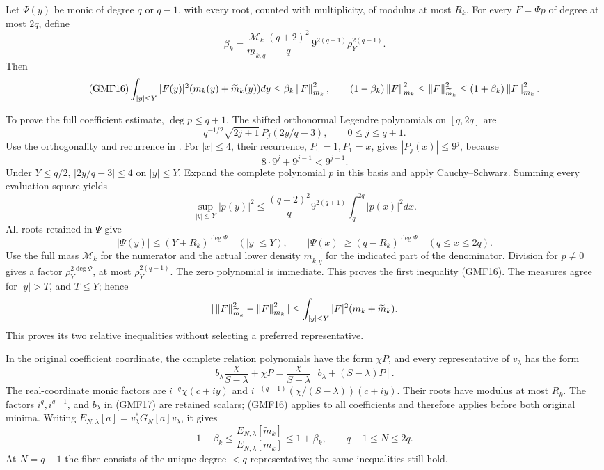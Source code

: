 \documentclass[11pt,a4paper]{article}
\begin{document}
Let \(\Psi(y)\) be monic of degree \(q\) or \(q-1\), with
every root, counted with multiplicity, of modulus at most \(R_k\).
For every \(F=\Psi p\) of degree at most \(2q\), define
\begin{equation}\tag{GMF15}
 \beta_k=
 \frac{\mathcal M_k}{\underline m_{k,q}}
 \frac{(q+2)^2}{q}\,9^{2(q+1)}
                     \rho_Y^{2(q-1)}.
\end{equation}
Then
\begin{equation}\tag{GMF16}
 \int_{|y|\le Y}|F(y)|^2(m_k(y)+\widetilde m_k(y))dy
 \le\beta_k\left\lVert F\right\rVert_{m_k}^2,\qquad
 (1-\beta_k)\left\lVert F\right\rVert_{m_k}^2
 \le\left\lVert F\right\rVert_{\widetilde m_k}^2
 \le(1+\beta_k)\left\lVert F\right\rVert_{m_k}^2.
\end{equation}

To prove the full coefficient estimate, \(\deg p\le q+1\).
The shifted orthonormal Legendre polynomials on \([q,2q]\)
are
\[
 q^{-1/2}\sqrt{2j+1}\,P_j(2y/q-3),\qquad 0\le j\le q+1.
\]
Use the orthogonality and recurrence in
\cite[Tables 18.3.1 and 18.9.1]{a02gmf:dlmfLegendre}.
For \(|x|\le4\), their recurrence, \(P_0=1,P_1=x\), gives
\(|P_j(x)|\le9^j\), because
\[
 8\cdot9^j+9^{j-1}<9^{j+1}.
\]
Under \(Y\le q/2\), \(|2y/q-3|\le4\) on \(|y|\le Y\).
Expand the complete polynomial \(p\) in this basis and
apply Cauchy--Schwarz.  Summing every evaluation square yields
\[
 \sup_{|y|\le Y}|p(y)|^2
 \le\frac{(q+2)^2}{q}9^{2(q+1)}
                         \int_q^{2q}|p(x)|^2dx.
\]
All roots retained in \(\Psi\) give
\[
 |\Psi(y)|\le(Y+R_k)^{\deg\Psi}\quad(|y|\le Y),\qquad
 |\Psi(x)|\ge(q-R_k)^{\deg\Psi}\quad(q\le x\le2q).
\]
Use the full mass \(\mathcal M_k\) for the numerator and the
actual lower density \(\underline m_{k,q}\) for the indicated
part of the denominator.  Division for \(p\ne0\) gives a
factor \(\rho_Y^{2\deg\Psi}\), at most
\(\rho_Y^{2(q-1)}\).  The zero polynomial is immediate.
This proves the first inequality (GMF16).
The measures agree for \(|y|>T\), and \(T\le Y\); hence
\[
 |\left\lVert F\right\rVert_{\widetilde m_k}^2-\left\lVert F\right\rVert_{m_k}^2|
 \le\int_{|y|\le Y}|F|^2(m_k+\widetilde m_k).
\]
This proves its two relative inequalities without selecting
a preferred representative.

In the original coefficient coordinate, the complete relation
polynomials have the form \(\chi P\), and every representative
of \(v_\lambda\) has the form
\begin{equation}\tag{GMF17}
 b_\lambda\frac{\chi}{S-\lambda}+\chi P
 =\frac{\chi}{S-\lambda}
                  [b_\lambda+(S-\lambda)P].
\end{equation}
The real-coordinate monic factors are
\(i^{-q}\chi(c+iy)\) and
\(i^{-(q-1)}(\chi/(S-\lambda))(c+iy)\).
Their roots have modulus at most \(R_k\).
The factors \(i^q,i^{q-1}\), and \(b_\lambda\) in (GMF17)
are retained scalars; (GMF16) applies to all coefficients and
therefore applies before both original minima.
Writing
\(E_{N,\lambda}[a]=v_\lambda^*G_N[a]v_\lambda\), it gives
\begin{equation}\tag{GMF18}
 1-\beta_k\le
 \frac{E_{N,\lambda}[\widetilde m_k]}{E_{N,\lambda}[m_k]}
 \le1+\beta_k,\qquad q-1\le N\le2q.
\end{equation}
At \(N=q-1\) the fibre consists of the unique degree-\(<q\)
representative; the same inequalities still hold.
\end{document}
